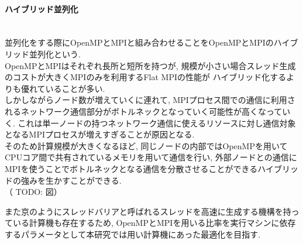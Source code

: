 \paragraph{ハイブリッド並列化}~\\
並列化をする際にOpenMPとMPIと組み合わせることをOpenMPとMPIのハイブリッド並列化という.\\
OpenMPとMPIはそれぞれ長所と短所を持つが, 規模が小さい場合スレッド生成のコストが大きくMPIのみを利用するFlat MPIの性能が
ハイブリッド化するよりも優れていることが多い.\\
しかしながらノード数が増えていくに連れて, MPIプロセス間での通信に利用されるネットワーク通信部分がボトルネックとなっていく可能性が高くなっていく.
これは単一ノードの持つネットワーク通信に使えるリソースに対し通信対象となるMPIプロセスが増えすぎることが原因となる.\\
そのため計算規模が大きくなるほど, 同じノードの内部ではOpenMPを用いてCPUコア間で共有されているメモリを用いて通信を行い,
外部ノードとの通信にMPIを使うことでボトルネックとなる通信を分散させることができるハイブリッドの強みを生かすことができる.\\

（ TODO: 図）

また京のようにスレッドバリアと呼ばれるスレッドを高速に生成する機構を持っている計算機も存在するため,
OpenMPとMPIを用いる比率を実行マシンに依存するパラメータとして本研究では用い計算機にあった最適化を目指す.\\
